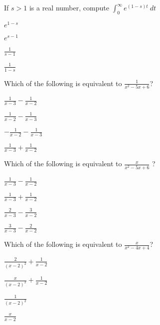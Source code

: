 \begin{readinessAssuranceTest}
\item  If \(s>1\) is a real number, compute \(\int _0 ^{\infty} e^{(1-s)t}\ dt\)
\begin{multicols}{4}
\begin{readinessAssuranceTestChoices}
\item \(e^{1-s}\)
\item \(e^{s-1}\)
\item \(\frac{1}{s-1}\) %
\item \(\frac{1}{1-s}\) 
\end{readinessAssuranceTestChoices}
\end{multicols}
\vfill

\newpage

\item Which of the following is equivalent to \(\frac{1}{x^2-5x+6}\)?
\begin{multicols}{4}
\begin{readinessAssuranceTestChoices}
\item \(\frac{1}{x-3}-\frac{1}{x-2}\)%
\item \(\frac{1}{x-2}-\frac{1}{x-3}\)
\item \(-\frac{1}{x-2}-\frac{1}{x-3}\)
\item \(\frac{1}{x-3}+\frac{1}{x-2}\)
\end{readinessAssuranceTestChoices}
\end{multicols}
\vfill


\item Which of the following is equivalent to \( \frac{x}{x^2-5x+6}\) ?
\begin{multicols}{4}
\begin{readinessAssuranceTestChoices}
\item \(\frac{1}{x-3}-\frac{1}{x-2} \) 
\item \(\frac{1}{x-3}+\frac{1}{x-2} \) 
\item \(\frac{2}{x-3}-\frac{3}{x-2} \) 
\item \(\frac{3}{x-3}-\frac{2}{x-2} \) %
\end{readinessAssuranceTestChoices}
\end{multicols}
\vfill


\item Which of the following is equivalent to \( \frac{x}{x^2-4x+4}\)?
\begin{multicols}{4}
\begin{readinessAssuranceTestChoices}
\item \(\frac{2}{(x-2)^2}+\frac{1}{x-2}\) %
\item \(\frac{x}{(x-2)^2}+\frac{1}{x-2}\) 
\item \(\frac{1}{(x-2)^2}\) 
\item \(\frac{x}{x-2}\) 
\end{readinessAssuranceTestChoices}
\end{multicols}
\vfill



\end{readinessAssuranceTest}
